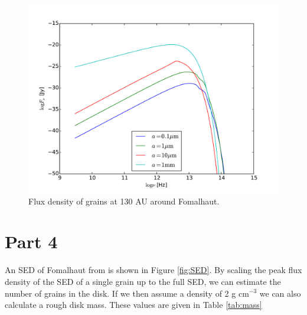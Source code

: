 \documentclass[12pt,preprint]{aastex}
\begin{document}
\begin{figure}[htbp]
\begin{center}
\includegraphics[width=\textwidth]{Fnu130AU.pdf}
    \caption{Flux density of grains at 130 AU around Fomalhaut.}
    \label{fig:Fnu130AU}
\end{center}
\end{figure}

\section{Part 4}
An SED of Fomalhaut from \citet{SED} is shown in Figure \ref{fig:SED}. By scaling the peak flux density of the SED of a single grain up to the full SED, we can estimate the number of grains in the disk. If we then assume a density of 2 g cm$^{-3}$ we can also calculate a rough disk mass. These values are given in Table \ref{tab:mass} 
\end{document}
